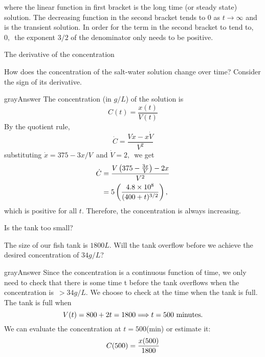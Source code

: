 where the linear function in first bracket is the long time (or steady state) solution.
The decreasing function in the second bracket tends to
$0$ as $t\to \infty$ and is the transient solution.
In order for the term in the second bracket to tend to, $0, \,$
the exponent $3/2$ of the denominator only needs to be positive.

\begin{exercise}
  The derivative of the concentration
\end{exercise}

How does the concentration of the salt-water solution change over time?
Consider the sign of its derivative.

\begin{mybox}{gray}{Answer}
  The concentration (in $g/L$) of the solution is
  \begin{equation*}
    C(t) = \frac{x(t)}{V(t)}
  \end{equation*}
  By the quotient rule,
  \begin{equation*}
    \dot{C} = \frac{V \dot{x} - x \dot{V}}{V^2}
  \end{equation*}
  substituting $\dot{x} = 375 - 3x/V \,$ and $\dot{V} = 2 , \, $ we get
  \begin{align*}
    \displaystyle \dot{C}  \displaystyle
    &= \displaystyle \displaystyle \frac{V\left(375-\frac{3x}{V}\right)-2x}{V^2} \\
    \displaystyle &= \displaystyle 5 \left(\frac{4.8 \times 10^8}{(400+t)^{3/2}}\right),
  \end{align*}
  which is positive for all $t$. Therefore, the concentration is always increasing. 
\end{mybox}

\begin{exercise}
  Is the tank too small?
\end{exercise}

The size of our fish tank is $1800 L$.
Will the tank overflow before we achieve the desired concentration of $34 g/L$?

\begin{mybox}{gray}{Answer}
  Since the concentration is a continuous function of time,
  we only need to check that there is some time t before the tank overflows
  when the concentration is $\, > 34 g/L$.
  We choose to check at the time when the tank is full.\\
  The tank is full when
  \begin{equation*}
    \displaystyle  \displaystyle V(t)=800+2t=1800
    \displaystyle \Longrightarrow
    \displaystyle  t=500 \text { minutes}.
  \end{equation*}
  We can evaluate the concentration at $t = 500$(min) or estimate it:
  \begin{equation*}
    \displaystyle  \displaystyle C(500)
    \displaystyle =
    \displaystyle \frac{x(500)}{1800}
  \end{equation*}
\end{mybox}
\clearpage

